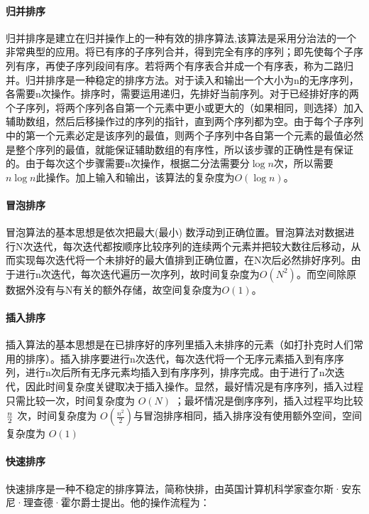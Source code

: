 \documentclass[UTF8]{ctexart}
\begin{document}
\paragraph{归并排序}
归并排序\cite{cormen1990introduction}是建立在归并操作上的一种有效的排序算法,该算法是采用分治法的一个非常典型的应用。将已有序的子序列合并，得到完全有序的序列；即先使每个子序列有序，再使子序列段间有序。若将两个有序表合并成一个有序表，称为二路归并。归并排序是一种稳定的排序方法。对于读入和输出一个大小为n的无序序列，各需要n次操作。排序时，需要运用递归，先排好当前序列。对于已经排好序的两个子序列，将两个序列各自第一个元素中更小或更大的（如果相同，则选择）加入辅助数组，然后后移操作过的序列的指针，直到两个序列都为空。由于每个子序列中的第一个元素必定是该序列的最值，则两个子序列中各自第一个元素的最值必然是整个序列的最值，就能保证辅助数组的有序性，所以该步骤的正确性是有保证的。由于每次这个步骤需要n次操作，根据二分法需要分$\log n$次，所以需要$n \log n$此操作。加上输入和输出，该算法的复杂度为$O(\log n)$。

\paragraph{冒泡排序}
冒泡算法\cite{cormen1990introduction}的基本思想是依次把最大(最小) 数浮动到正确位置。冒泡算法对数据进行N次迭代，每次迭代都按顺序比较序列的连续两个元素并把较大数往后移动，从而实现每次迭代将一个未排好的最大值排到正确位置，在N次后必然排好序列。由于进行n次迭代，每次迭代遍历一次序列，故时间复杂度为$O(N^2)$。而空间除原数据外没有与N有关的额外存储，故空间复杂度为$O(1)$。

\paragraph{插入排序}
插入算法的基本思想是在已排序好的序列里插入未排序的元素（如打扑克时人们常用的排序）。插入排序\cite{cormen1990introduction}要进行n次迭代，每次迭代将一个无序元素插入到有序序列，进行n次后所有无序元素均插入到有序序列，排序完成。由于进行了n次迭代，因此时间复杂度关键取决于插入操作。显然，最好情况是有序序列，插入过程只需比较一次，时间复杂度为 $O(N)$ ；最坏情况是倒序序列，插入过程平均比较 $n \over 2$ 次，时间复杂度为 $O(\frac{n^2}{2})$与冒泡排序相同，插入排序没有使用额外空间，空间复杂度为 $O(1)$

\paragraph{快速排序}
快速排序是一种不稳定的排序算法，简称快排，由英国计算机科学家查尔斯·安东尼·理查德·霍尔爵士提出。他的操作流程为：
\end{document}
